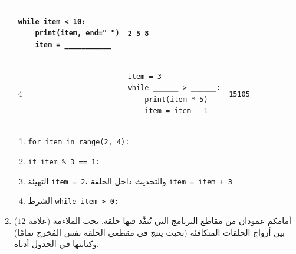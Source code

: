 \documentclass[14pt]{extarticle}
\begin{document}
\begin{enumerate}[label=\textbf{السؤال \arabic*:}, wide=0pt, itemsep=2.2em]
{\begin{longtable}{|C{1.5cm}|p{9cm}|C{4cm}|}
\begin{pycell}
\begin{english}
\begin{verbatim}
while item < 10:
    print(item, end=" ")
    item = ___________
\end{verbatim}
\end{english}
\end{pycell}
& \begin{english}\texttt{2 5 8}\end{english} \\
\hline
$4$ &
\begin{pycell}
\begin{english}
\begin{verbatim}
item = 3
while ______ > ______:
    print(item * 5)
    item = item - 1
\end{verbatim}
\end{english}
\end{pycell}
& \begin{english}\texttt{15}\newline\texttt{10}\newline\texttt{5}\end{english} \\
\hline
\end{longtable}}

\ifwithsols
\begin{boxSolution}
\begin{enumerate}[label=\arabic*.]
\item \textenglish{\texttt{for item in range(2, 4):}}
\item \textenglish{\texttt{if item \% 3 == 1:}}
\item التهيئة \textenglish{\texttt{item = 2}}، والتحديث داخل الحلقة \textenglish{\texttt{item = item + 3}}
\item الشرط \textenglish{\texttt{while item > 0:}}
\end{enumerate}
\end{boxSolution}
\fi
\filbreak

\item ($12$ علامة) أمامكم عمودان من مقاطع البرنامج التي تُنفَّذ فيها حلقة. يجب الملاءمة بين أزواج الحلقات المتكافئة (بحيث ينتج في مقطعي الحلقة نفس المُخرج تمامًا) وكتابتها في الجدول أدناه.


\end{enumerate}
\end{document}
